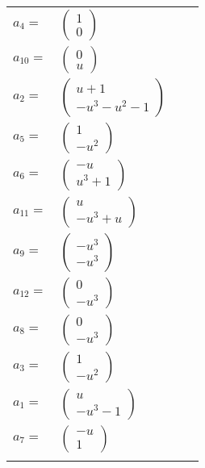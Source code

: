 \documentclass[1p]{elsarticle_modified}
\theoremstyle{definition}
\begin{document}
\begin{tabular}{m{7pt} m{180pt} m{7pt} m{180pt} }
\flushright $a_{4}=$&$\begin{pmatrix}1\\0\end{pmatrix}$ \\
\flushright $a_{10}=$&$\begin{pmatrix}0\\u\end{pmatrix}$ \\
\flushright $a_{2}=$&$\begin{pmatrix}u+1\\- u^3- u^2-1\end{pmatrix}$ \\
\flushright $a_{5}=$&$\begin{pmatrix}1\\- u^2\end{pmatrix}$ \\
\flushright $a_{6}=$&$\begin{pmatrix}- u\\u^3+1\end{pmatrix}$ \\
\flushright $a_{11}=$&$\begin{pmatrix}u\\- u^3+u\end{pmatrix}$ \\
\flushright $a_{9}=$&$\begin{pmatrix}- u^3\\- u^3\end{pmatrix}$ \\
\flushright $a_{12}=$&$\begin{pmatrix}0\\- u^3\end{pmatrix}$ \\
\flushright $a_{8}=$&$\begin{pmatrix}0\\- u^3\end{pmatrix}$ \\
\flushright $a_{3}=$&$\begin{pmatrix}1\\- u^2\end{pmatrix}$ \\
\flushright $a_{1}=$&$\begin{pmatrix}u\\- u^3-1\end{pmatrix}$ \\
\flushright $a_{7}=$&$\begin{pmatrix}- u\\1\end{pmatrix}$\\&\end{tabular}
\end{document}
